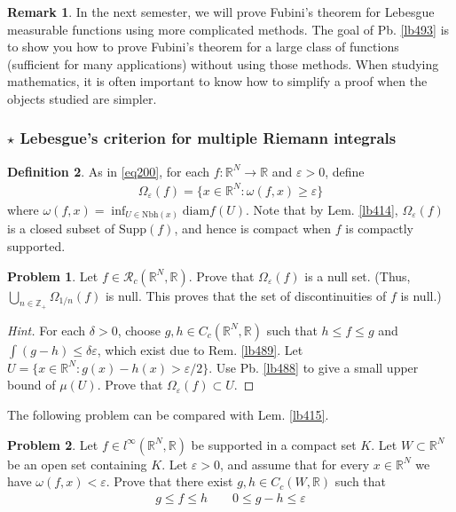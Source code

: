\documentclass[12pt,b5paper,notitlepage]{article}
\theoremstyle{definition}
\newtheorem{df}{Definition}[section]
\newtheorem{rem}[df]{Remark}
\newtheorem{prob}{\color{red}Problem}[section]
\theoremstyle{plain}
\newcommand{\scr}{\mathscr}
\newcommand{\Zbb}{\mathbb Z}
\newcommand{\Rbb}{\mathbb R}
\newcommand{\Supp}{\mathrm{Supp}}
\newcommand{\Nbh}{\mathrm{Nbh}}
\newcommand{\diam}{\mathrm{diam}}
\newcommand{\eps}{\varepsilon}
\numberwithin{equation}{section}
\begin{document}
\begin{rem}
In the next semester, we will prove Fubini's theorem for Lebesgue measurable functions using more complicated methods. The goal of Pb. \ref{lb493} is to show you how to prove Fubini's theorem for a large class of functions (sufficient for many applications) without using those methods. When studying mathematics, it is often important to know how to simplify a proof when the objects studied are simpler.
\end{rem}



\subsubsection{$\star$ Lebesgue's criterion for multiple Riemann integrals}\label{lb495} 

\begin{df}
As in \eqref{eq200}, for each $f:\Rbb^N\rightarrow\Rbb$ and $\eps>0$, define
\begin{align}
\Omega_\eps(f)=\{x\in\Rbb^N:\omega(f,x)\geq\eps\}
\end{align}
where $\omega(f,x)=\inf_{U\in\Nbh(x)}\diam f(U)$. Note that by Lem. \ref{lb414}, $\Omega_\eps(f)$ is a closed subset of $\Supp(f)$, and hence is compact when $f$ is compactly supported.
\end{df}


\begin{prob}
Let $f\in \scr R_c(\Rbb^N,\Rbb)$.   Prove that $\Omega_\eps(f)$ is a null set. (Thus, $\bigcup_{n\in\Zbb_+}\Omega_{1/n}(f)$ is null. This proves that the set of discontinuities of $f$ is null.)
\end{prob}

\begin{proof}[Hint]
For each $\delta>0$, choose $g,h\in C_c(\Rbb^N,\Rbb)$ such that $h\leq f\leq g$ and $\int(g-h)\leq\delta\eps$, which exist due to Rem. \ref{lb489}. Let $U=\{x\in\Rbb^N:g(x)-h(x)>\eps/2\}$. Use Pb. \ref{lb488} to give a small upper bound of $\mu(U)$. Prove that $\Omega_\eps(f)\subset U$.
\end{proof}


The following problem can be compared with Lem. \ref{lb415}.

\begin{prob}\label{lb491}
Let $f\in l^\infty(\Rbb^N,\Rbb)$ be supported in a compact set $K$. Let $W\subset\Rbb^N$ be an open set containing $K$. Let $\eps>0$, and assume that for every $x\in\Rbb^N$ we have $\omega(f,x)<\eps$. Prove that there exist $g,h\in C_c(W,\Rbb)$ such that
\begin{gather*}
g\leq f\leq h\qquad 0\leq g-h\leq\eps
\end{gather*}
\end{prob}
\end{document}
